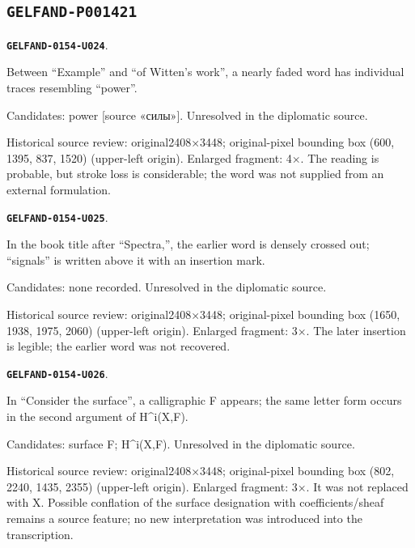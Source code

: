 \documentclass[11pt]{article}
\theoremstyle{definition}
\theoremstyle{remark}
\begin{document}
\subsection*{\texttt{GELFAND-P001421}}
\par\noindent\leavevmode{}\label{GELFAND-0154-U024}\label{GELFAND-P001421:witten-heading-faint-word:note}\textbf{\texttt{GELFAND-0154-U024}}.\nopagebreak[4]\par
Between “Example” and “of Witten’s work”, a nearly faded word has individual traces resembling “power”.\par
Candidates: power [source «силы»]. Unresolved in the diplomatic source.\par
Historical source review: original2408×3448; original-pixel bounding box (600, 1395, 837, 1520) (upper-left origin). Enlarged fragment: 4×. The reading is probable, but stroke loss is considerable; the word was not supplied from an external formulation.\par\medskip
\par\noindent\leavevmode{}\label{GELFAND-0154-U025}\label{GELFAND-P001421:book-title-cancelled:note}\textbf{\texttt{GELFAND-0154-U025}}.\nopagebreak[4]\par
In the book title after “Spectra,”, the earlier word is densely crossed out; “signals” is written above it with an insertion mark.\par
Candidates: none recorded. Unresolved in the diplomatic source.\par
Historical source review: original2408×3448; original-pixel bounding box (1650, 1938, 1975, 2060) (upper-left origin). Enlarged fragment: 3×. The later insertion is legible; the earlier word was not recovered.\par\medskip
\par\noindent\leavevmode{}\label{GELFAND-0154-U026}\label{GELFAND-P001421:surface-symbol:note}\textbf{\texttt{GELFAND-0154-U026}}.\nopagebreak[4]\par
In “Consider the surface”, a calligraphic F appears; the same letter form occurs in the second argument of H\textasciicircum{}i(X,F).\par
Candidates: surface F; H\textasciicircum{}i(X,F). Unresolved in the diplomatic source.\par
Historical source review: original2408×3448; original-pixel bounding box (802, 2240, 1435, 2355) (upper-left origin). Enlarged fragment: 3×. It was not replaced with X. Possible conflation of the surface designation with coefficients/sheaf remains a source feature; no new interpretation was introduced into the transcription.\par\medskip
\end{document}
